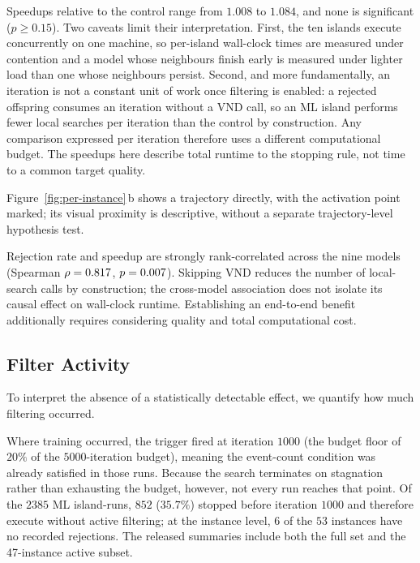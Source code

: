 \documentclass[a4paper,fleqn]{cas-dc}
\begin{document}
Speedups relative to the control range from $1.008$ to $1.084$, and none is
significant ($p \geq 0.15$). Two caveats limit their interpretation. First, the ten islands execute concurrently on one machine, so
per-island wall-clock times are measured under contention and a model whose
neighbours finish early is measured under lighter load than one whose neighbours
persist. Second, and more fundamentally, an iteration is not a constant unit of
work once filtering is enabled: a rejected offspring consumes an iteration
without a VND call, so an ML island performs fewer local searches per iteration
than the control by construction. Any comparison expressed per iteration
therefore uses a different computational budget. The speedups here describe
total runtime to the stopping rule, not time to a common target quality.

Figure~\ref{fig:per-instance}\,b shows a trajectory directly, with the activation
point marked; its visual proximity is descriptive, without a separate
trajectory-level hypothesis test.

Rejection rate and speedup are strongly rank-correlated across the nine models
(Spearman $\rho = 0.817$, $p = 0.007$). Skipping VND
reduces the number of local-search calls by construction; the cross-model
association does not isolate its causal effect on wall-clock runtime. Establishing an end-to-end
benefit additionally requires considering quality and total computational cost.

\subsection{Filter Activity}\label{sec:res-activity}

To interpret the absence of a statistically detectable effect, we quantify how
much filtering occurred.

Where training occurred, the trigger fired at iteration $1000$ (the budget
floor of $20\%$ of the $5000$-iteration budget), meaning the event-count
condition was already satisfied in those runs. Because the search
terminates on stagnation rather than exhausting the budget, however, not every
run reaches that point. Of the $2385$ ML island-runs, $852$ ($35.7\%$) stopped
before iteration $1000$ and therefore execute without active filtering; at the
instance level, $6$ of the $53$ instances have no recorded rejections. The
released summaries include both the full set and the 47-instance active subset.
\end{document}

